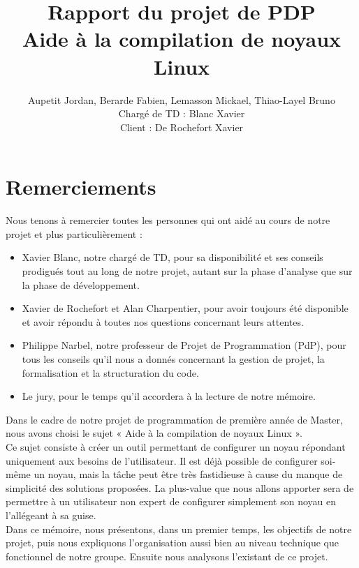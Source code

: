 ﻿\documentclass[17pts]{report}
\title{Rapport du projet de PDP \\ Aide à la compilation de noyaux Linux}
\author{Aupetit Jordan, Berarde Fabien, Lemasson Mickael, Thiao-Layel Bruno \\
        Chargé de TD : Blanc Xavier\\
        Client : De Rochefort Xavier}
\begin{document}
\maketitle
\newpage
\pagestyle{empty}
\chapter*{Remerciements}

Nous tenons à remercier toutes les personnes qui ont aidé au cours de notre
projet et plus particulièrement :\\

\begin{itemize}
  \item Xavier Blanc, notre chargé de TD, pour sa disponibilité et ses conseils
      prodigués tout au long de notre projet, autant sur la phase d'analyse que
      sur la phase de développement.
  \item Xavier de Rochefort et Alan Charpentier, pour avoir toujours été
      disponible et avoir répondu à toutes nos questions concernant leurs
      attentes.
  \item Philippe Narbel, notre professeur de Projet de Programmation (PdP), pour tous
      les conseils qu'il nous a donnés concernant la gestion de projet, la
      formalisation et la structuration du code.
  \item Le jury, pour le temps qu'il accordera à la lecture de notre mémoire.
\end{itemize}

\tableofcontents
\clearpage
\listoffigures
\clearpage

\pagestyle{IHA-fancy-style}

Dans le cadre de notre projet de programmation de première année de Master,
nous avons choisi le sujet « Aide à la compilation de noyaux Linux ».  \\

Ce sujet consiste à créer un outil permettant de configurer un noyau répondant
uniquement aux besoins de l'utilisateur. Il est déjà possible de configurer
soi-même un noyau, mais la tâche peut être très fastidieuse à cause du manque
de simplicité des solutions proposées. La plus-value que nous allons apporter
sera de permettre à un utilisateur non expert de configurer simplement son
noyau en l'allégeant à sa guise.  \\

Dans ce mémoire, nous présentons, dans un premier temps, les objectifs de notre
projet, puis nous expliquons l’organisation aussi bien au niveau technique que
fonctionnel de notre groupe. Ensuite nous analysons l'existant de ce projet.
\\
\end{document}
